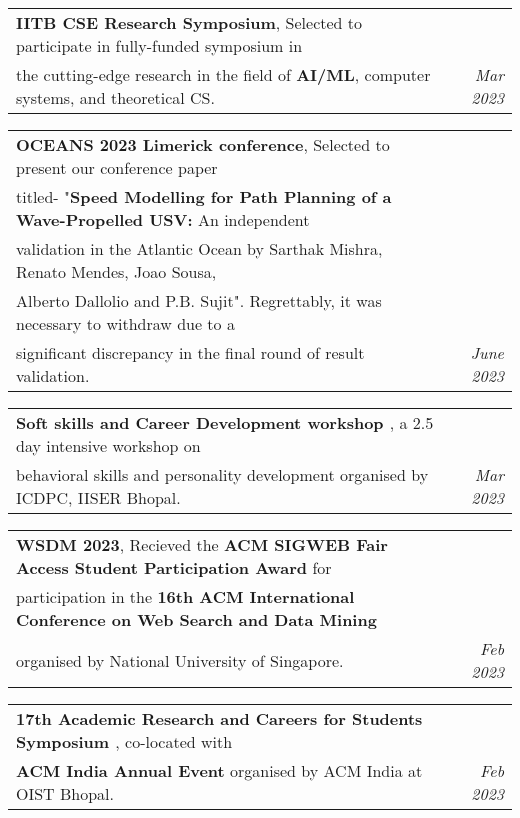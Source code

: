 \documentclass[a4paper,11pt]{article}
\makeatletter
\newcommand{\resumePOR}[3]{
\vspace{0.5mm}\item
    \begin{tabular*}{0.97\textwidth}[t]{l@{\extracolsep{\fill}}r}
        \textbf{#1}, \hspace{0.3mm}#2 & \textit{\small{#3}} 
    \end{tabular*}
    \vspace{-2mm}
}
\makeatother
\begin{document}
    
    \resumePOR{IITB CSE Research Symposium} %
    {Selected to participate in fully-funded symposium in \\the cutting-edge research in the field of \textbf{AI/ML}, computer systems, and theoretical CS.} %
    {Mar 2023} %
    
    \resumePOR{OCEANS 2023 Limerick conference} %
    {Selected to present our conference paper \\ titled- "\textbf{Speed Modelling for Path Planning of a Wave-Propelled USV:} An independent \\validation in the Atlantic Ocean by Sarthak Mishra, Renato Mendes, Joao Sousa, \\Alberto Dallolio and P.B. Sujit". Regrettably, it was necessary to withdraw due to a \\significant discrepancy in the final round of result validation.}%
    {June 2023} %
    
    \resumePOR{Soft skills and Career Development workshop \href{https://drive.google.com/file/d/1QU1xaKHtkA27EPc2FdgE4_J931uG89aO/view?usp=sharing}{\footnotesize \faIcon{external-link-alt}}} %
    {a 2.5 day intensive workshop on \\ behavioral skills and personality development organised by ICDPC, IISER Bhopal.} %
    {Mar 2023} %
    
    \resumePOR{WSDM 2023} %
    {Recieved the \textbf{ACM SIGWEB Fair Access Student Participation Award} for \\ participation in the \textbf{16th ACM International Conference on Web Search and Data Mining} \\ organised by National University of Singapore.} %
    {Feb 2023} %
    
    \resumePOR{17th Academic Research and Careers for Students Symposium \href{https://drive.google.com/file/d/1fGxtl493hVgFFttQA-xtD2-bYf9KBpXN/view?usp=sharing}{\footnotesize \faIcon{external-link-alt}}} %
    {\textnormal{co-located with} \\ \textbf{ACM India Annual Event} organised by ACM India at OIST Bhopal.} %
    {Feb 2023} %
\end{document}
